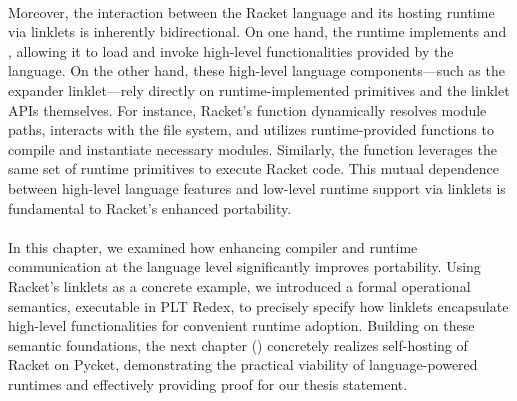 		\paragraph{}%
			Moreover, the interaction between the Racket language and its hosting runtime via linklets is inherently bidirectional. On one hand, the runtime implements  and , allowing it to load and invoke high-level functionalities provided by the language. On the other hand, these high-level language components—such as the expander linklet—rely directly on runtime-implemented primitives and the linklet APIs themselves. For instance, Racket's  function dynamically resolves module paths, interacts with the file system, and utilizes runtime-provided functions to compile and instantiate necessary modules. Similarly, the  function leverages the same set of runtime primitives to execute Racket code. This mutual dependence between high-level language features and low-level runtime support via linklets is fundamental to Racket's enhanced portability.

		\paragraph{}%
			In this chapter, we examined how enhancing compiler and runtime communication at the language level significantly improves portability. Using Racket’s linklets as a concrete example, we introduced a formal operational semantics, executable in PLT Redex, to precisely specify how linklets encapsulate high-level functionalities for convenient runtime adoption. Building on these semantic foundations, the next chapter () concretely realizes self-hosting of Racket on Pycket, demonstrating the practical viability of language-powered runtimes and effectively providing proof for our thesis statement.


